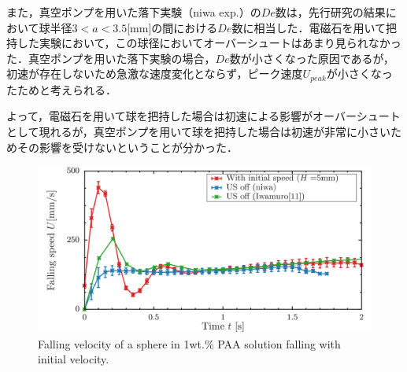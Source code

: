 また，真空ポンプを用いた落下実験（niwa exp.）の$De$数は，先行研究の結果において球半径$3<a<3.5$[mm]の間における$De$数に相当した．電磁石を用いて把持した実験において，この球径においてオーバーシュートはあまり見られなかった．真空ポンプを用いた落下実験の場合，$De$数が小さくなった原因であるが，初速が存在しないため急激な速度変化とならず，ピーク速度$U_{peak}$が小さくなったためと考えられる．

よって，電磁石を用いて球を把持した場合は初速による影響がオーバーシュートとして現れるが，真空ポンプを用いて球を把持した場合は初速が非常に小さいためその影響を受けないということが分かった．

\begin{figure}[ht]
    \begin{center}
        \includegraphics[width=15cm,clip]{5-Discussion/h-5.png}
        \caption{Falling velocity of a sphere in 1wt.\% PAA solution falling with initial velocity.}
        \label{fig:h-5}
    \end{center}
\end{figure}